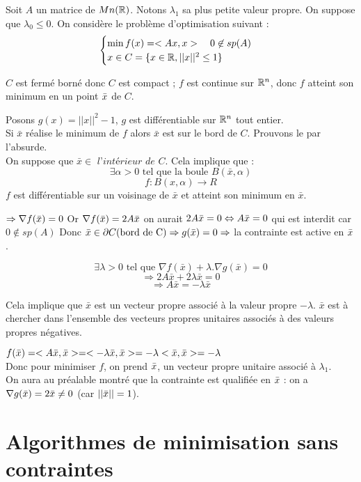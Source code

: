 \begin{exemple}

	Soit $A$ un matrice de $Mn(\mathbb{R})$. Notons $\lambda _1$ sa plus petite valeur propre. On suppose que $\lambda _0 \leq 0$. On considère le problème d'optimisation suivant : \[ \begin{cases}\min f(x) = <Ax, x> \quad 0 \not \in sp(A)\\ x \in C = \{ x \in \mathbb{R}, ||x||^2 \leq 1 \} \end{cases} \]
	
	$C$ est fermé borné donc $C$ est compact ;
	$f$ est continue sur $\mathbb{R}^n$, donc $f$ atteint son minimum en un point $\bar{x}$ de $C$.
	
	Posons $ g(x) = ||x||^2 - 1 $, $g$ est différentiable sur $\mathbb{R}^n$ tout entier.\\
Si $\bar{x}$ réalise le minimum de $f$ alors $\bar{x}$ est sur le bord de $C$. Prouvons le par l'absurde.\\
On suppose que $\bar{x} \in \textit{ l'intérieur de }C $.
Cela implique que : \[ \exists \alpha>0 \text{ tel que la boule } B(\bar{x},\alpha)  \]
\[ f : B(x,\alpha) \rightarrow R \]
$f$ est différentiable sur un voisinage de $\bar{x}$ et atteint son minimum en $\bar{x}$.
	
	$\Rightarrow \nabla f(\bar{x}) = 0$
	Or $\nabla f(\bar{x}) = 2A\bar{x}$
	on aurait $2A\bar{x} = 0 \Leftrightarrow A\bar{x} = 0$ qui est interdit car $0 \not \in sp(A)$
	Donc $\bar{x} \in \partial C \text{(bord de C)} \Rightarrow g(\bar{x}) = 0 \Rightarrow$ la contrainte est active en $\bar{x}$.
	
	\[ \exists \lambda > 0 \text{ tel que } \nabla f(\bar{x}) + \lambda.\nabla g(\bar{x}) = 0 \]
\[ \Rightarrow 2A\bar{x} + 2\lambda\bar{x} = 0 \]
\[ \Rightarrow A\bar{x} = - \lambda\bar{x}\]

Cela implique que $\bar{x}$ est un vecteur propre associé à la valeur propre $-\lambda$. $\bar{x}$ est à chercher dans l'ensemble des vecteurs propres unitaires associés à des valeurs propres négatives.
	
	$f(\bar{x}) = <A\bar{x}, \bar{x}> = <-\lambda \bar{x}, \bar{x}> = -\lambda <\bar{x}, \bar{x}> = - \lambda$ \\
	Donc pour minimiser $f$, on prend $\bar{x}$, un vecteur propre unitaire associé à $\lambda_1$.\\
	On aura au préalable montré que la contrainte est qualifiée en $\bar{x}$ : on a $\nabla g(\bar{x}) = 2\bar{x} \ne 0$ (car $||\bar{x}||=1$).
	
\end{exemple}

\section{Algorithmes de minimisation sans contraintes}
